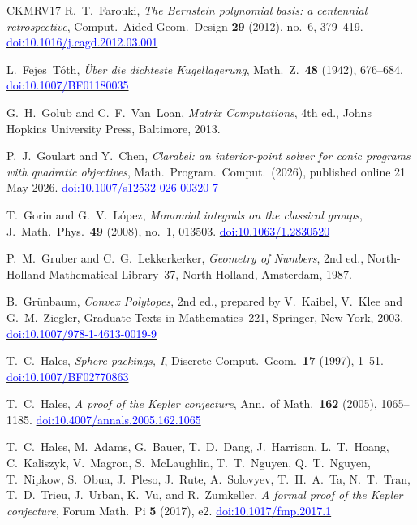 \documentclass[11pt,reqno]{amsart}
\newcommand{\bluelink}[2]{\href{#1}{\textcolor{blue}{#2}}}
\renewcommand{\_}{\origunderscore\allowbreak}
\numberwithin{equation}{section}
\theoremstyle{plain}
\theoremstyle{definition}
\theoremstyle{remark}
\begin{document}
\begin{thebibliography}{CKMRV17}
R.~T.~Farouki,
\textit{The {B}ernstein polynomial basis: a centennial retrospective},
Comput.\ Aided Geom.\ Design \textbf{29} (2012), no.~6, 379--419.
\bluelink{https://doi.org/10.1016/j.cagd.2012.03.001}{doi:10.1016/j.cagd.2012.03.001}

L.~Fejes~T\'oth,
\textit{\"Uber die dichteste Kugellagerung},
Math.\ Z.\ \textbf{48} (1942), 676--684.
\bluelink{https://doi.org/10.1007/BF01180035}{doi:10.1007/BF01180035}

G.~H.~Golub and C.~F.~Van~Loan,
\textit{Matrix Computations}, 4th ed.,
Johns Hopkins University Press, Baltimore, 2013.

P.~J.~Goulart and Y.~Chen,
\textit{Clarabel: an interior-point solver for conic programs with quadratic objectives},
Math.\ Program.\ Comput.\ (2026), published online 21 May 2026.
\bluelink{https://doi.org/10.1007/s12532-026-00320-7}{doi:10.1007/s12532-026-00320-7}

T.~Gorin and G.~V.~L\'opez,
\textit{Monomial integrals on the classical groups},
J.\ Math.\ Phys.\ \textbf{49} (2008), no.~1, 013503.
\bluelink{https://doi.org/10.1063/1.2830520}{doi:10.1063/1.2830520}

P.~M.~Gruber and C.~G.~Lekkerkerker,
\textit{Geometry of Numbers}, 2nd ed.,
North-Holland Mathematical Library~37, North-Holland, Amsterdam, 1987.

B.~Gr\"unbaum,
\textit{Convex Polytopes}, 2nd ed., prepared by V.~Kaibel, V.~Klee and
G.~M.~Ziegler,
Graduate Texts in Mathematics~221, Springer, New York, 2003.
\bluelink{https://doi.org/10.1007/978-1-4613-0019-9}{doi:10.1007/978-1-4613-0019-9}

T.~C.~Hales,
\textit{Sphere packings, {I}},
Discrete Comput.\ Geom.\ \textbf{17} (1997), 1--51.
\bluelink{https://doi.org/10.1007/BF02770863}{doi:10.1007/BF02770863}

T.~C.~Hales,
\textit{A proof of the {K}epler conjecture},
Ann.\ of Math.\ \textbf{162} (2005), 1065--1185.
\bluelink{https://doi.org/10.4007/annals.2005.162.1065}{doi:10.4007/annals.2005.162.1065}

T.~C.~Hales, M.~Adams, G.~Bauer, T.~D.~Dang, J.~Harrison, L.~T.~Hoang,
C.~Kaliszyk, V.~Magron, S.~McLaughlin, T.~T.~Nguyen, Q.~T.~Nguyen,
T.~Nipkow, S.~Obua, J.~Pleso, J.~Rute, A.~Solovyev, T.~H.~A.~Ta,
N.~T.~Tran, T.~D.~Trieu, J.~Urban, K.~Vu, and R.~Zumkeller,
\textit{A formal proof of the {K}epler conjecture},
Forum Math.\ Pi \textbf{5} (2017), e2.
\bluelink{https://doi.org/10.1017/fmp.2017.1}{doi:10.1017/fmp.2017.1}


\end{thebibliography}
\end{document}
